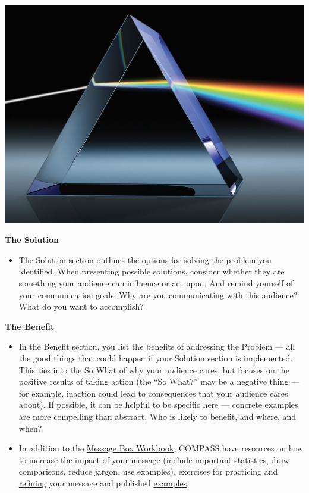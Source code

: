 \documentclass[
]{book}
\providecommand{\tightlist}{%
  \setlength{\itemsep}{0pt}\setlength{\parskip}{0pt}}
\begin{document}
\includegraphics{images/m4s1_prism.jpeg}

\textbf{The Solution}

\begin{itemize}
\tightlist
\item
  The Solution section outlines the options for solving the problem you identified. When presenting possible solutions, consider whether they are something your audience can influence or act upon. And remind yourself of your communication goals: Why are you communicating with this audience? What do you want to accomplish?
\end{itemize}

\textbf{The Benefit}

\begin{itemize}
\item
  In the Benefit section, you list the benefits of addressing the Problem --- all the good things that could happen if your Solution section is implemented. This ties into the So What of why your audience cares, but focuses on the positive results of taking action (the ``So What?'' may be a negative thing --- for example, inaction could lead to consequences that your audience cares about). If possible, it can be helpful to be specific here --- concrete examples are more compelling than abstract. Who is likely to benefit, and where, and when?
\item
  In addition to the \href{https://www.compassscicomm.org/wp-content/uploads/2020/05/The-Message-Box-Workbook.pdf}{Message Box Workbook}, COMPASS have resources on how to \href{https://www.compassscicomm.org/practice/}{increase the impact} of your message (include important statistics, draw comparisons, reduce jargon, use examples), exercises for practicing and \href{https://www.compassscicomm.org/compare/}{refining} your message and published \href{https://www.compassscicomm.org/examples/}{examples}.
\end{itemize}
\end{document}
